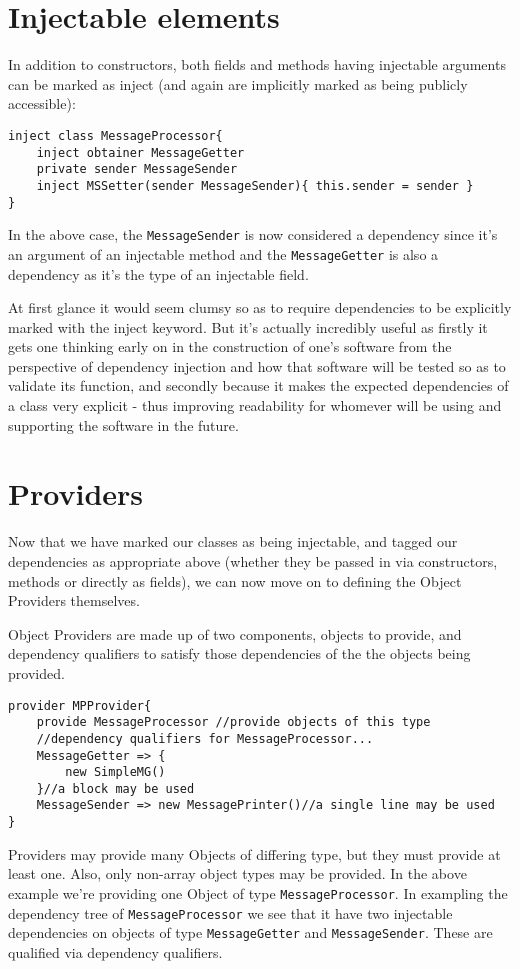 \documentclass[conc-doc]{subfiles}
\begin{document}
\section{Injectable elements}
In addition to constructors, both fields and methods having injectable arguments can be marked as inject (and again are implicitly marked as being publicly accessible):
\begin{lstlisting}
inject class MessageProcessor{
	inject obtainer MessageGetter
	private sender MessageSender
	inject MSSetter(sender MessageSender){ this.sender = sender }
}
\end{lstlisting}

In the above case, the \lstinline{MessageSender} is now considered a dependency since it's an argument of an injectable method and the \lstinline{MessageGetter} is also a dependency as it's the type of an injectable field.

At first glance it would seem clumsy so as to require dependencies to be explicitly marked with the inject keyword. But it's actually incredibly useful as firstly it gets one thinking early on in the construction of one's software from the perspective of dependency injection and how that software will be tested so as to validate its function, and secondly because it makes the expected dependencies of a class very explicit - thus improving readability for whomever will be using and supporting the software in the future.

\section{Providers}
Now that we have marked our classes as being injectable, and tagged our dependencies as appropriate above (whether they be passed in via constructors, methods or directly as fields), we can now move on to defining the Object Providers themselves.

Object Providers are made up of two components, objects to provide, and dependency qualifiers to satisfy those dependencies of the the objects being provided.

\begin{lstlisting}
provider MPProvider{
	provide MessageProcessor //provide objects of this type
	//dependency qualifiers for MessageProcessor...
	MessageGetter => {
		new SimpleMG()
	}//a block may be used
	MessageSender => new MessagePrinter()//a single line may be used
}
\end{lstlisting}

Providers may provide many Objects of differing type, but they must provide at least one. Also, only non-array object types may be provided. In the above example we're providing one Object of type \lstinline{MessageProcessor}. In exampling the dependency tree of \lstinline{MessageProcessor} we see that it have two injectable dependencies on objects of  type \lstinline{MessageGetter} and \lstinline{MessageSender}. These are qualified via dependency qualifiers.
\end{document}
